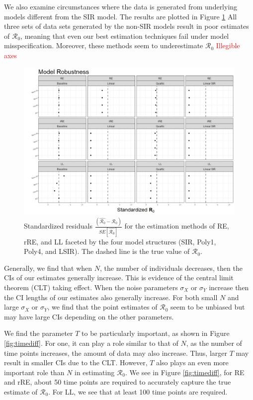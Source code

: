 \documentclass[12pt]{article}
\newcommand{\com}[1]{\textcolor{red}{ #1}}
\newcommand{\rr}{\ensuremath{\mathcal{R}_0}}
\begin{document}
We also examine circumstances where the data is generated from underlying models different from the SIR model.  The results are plotted in Figure \ref{fig:mod-rob}  All three sets of data sets generated by the non-SIR models result in poor estimates of $\rr$, meaning that even our best estimation techniques fail under model misspecification.  Moreover, these methods seem to underestimate $\rr$ \com{Illegible axes}

\begin{figure}[H]
	\centering
	\includegraphics[scale=0.5]{images/model_robust.jpeg}
	\caption{Standardized residuals $\frac{\left ( \hat{\rr} - \rr\right ) }{SE \left [\hat{\rr}\right ]}$ for the estimation methods of RE, rRE, and LL faceted by the four model structures (SIR, Poly1, Poly4, and LSIR).  The dashed line is the true value of $\rr$.}\label{fig:mod-rob}
\end{figure}


Generally, we find that when $N$, the number of individuals decreases, then the CIs of our estimates generally increase.  This is evidence of the  central limit theorem (CLT) taking effect.   When the noise parameters $\sigma_X$ or $\sigma_Y$ increase then the CI lengths of our estimates also generally increase.  For both small $N$ and large $\sigma_X$ or $\sigma_Y$, we find that the point estimates of $\rr$ seem to be unbiased but may have large CIs depending on the other parameters.

We find the parameter $T$ to be particularly important, as shown in Figure \ref{fig:timediff}.  For one, it can play a role similar to that of $N$, as the number of time points increases, the amount of data may also increase.  Thus, larger $T$ may result in smaller CIs due to the CLT.  However, $T$ also plays an even more important role than $N$ in estimating $\rr$.  We see in Figure \ref{fig:timediff}, for RE and rRE, about 50 time points are required to accurately capture the true estimate of $\rr$.  For LL, we see that at least 100 time points are required.
\end{document}
